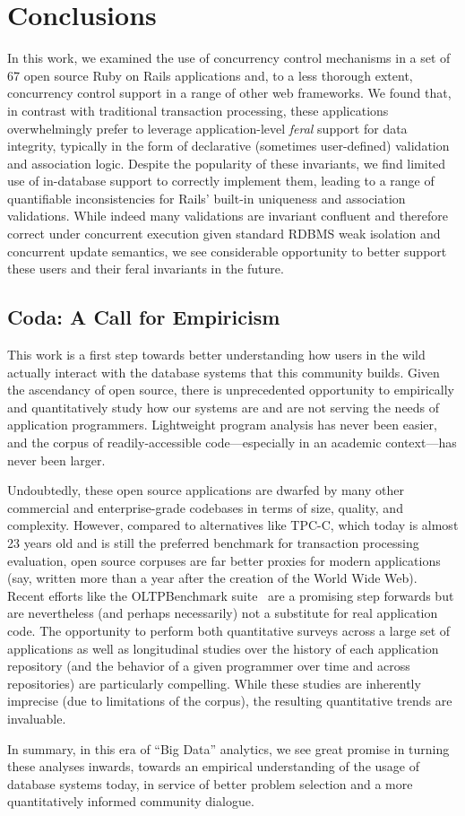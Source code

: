 
\section{Conclusions}
\label{sec:conclusion}

In this work, we examined the use of concurrency control mechanisms in
a set of 67 open source Ruby on Rails applications and, to a less
thorough extent, concurrency control support in a range of other web
frameworks. We found that, in contrast with traditional transaction
processing, these applications overwhelmingly prefer to leverage
application-level \textit{feral} support for data integrity, typically
in the form of declarative (sometimes user-defined) validation and
association logic. Despite the popularity of these invariants, we find
limited use of in-database support to correctly implement them,
leading to a range of quantifiable inconsistencies for Rails' built-in
uniqueness and association validations. While indeed many validations
are invariant confluent and therefore correct under concurrent
execution given standard RDBMS weak isolation and concurrent update
semantics, we see considerable opportunity to better support these
users and their feral invariants in the future.


\subsection*{Coda: A Call for Empiricism}

This work is a first step towards better understanding how users in
the wild actually interact with the database systems that this
community builds. Given the ascendancy of open source, there is
unprecedented opportunity to empirically and quantitatively study how
our systems are and are not serving the needs of application
programmers. Lightweight program analysis has never been easier, and
the corpus of readily-accessible code---especially in an academic
context---has never been larger.

Undoubtedly, these open source applications are dwarfed by many other
commercial and enterprise-grade codebases in terms of size, quality,
and complexity. However, compared to alternatives like TPC-C, which
today is almost 23 years old and is still the preferred benchmark for
transaction processing evaluation, open source corpuses are far better
proxies for modern applications (say, written more than a year after
the creation of the World Wide Web). Recent efforts like the
OLTPBenchmark suite~\cite{oltpbench} are a promising step forwards but
are nevertheless (and perhaps necessarily) not a substitute for real
application code. The opportunity to perform both quantitative surveys
across a large set of applications as well as longitudinal studies
over the history of each application repository (and the behavior of a
given programmer over time and across repositories) are particularly
compelling. While these studies are inherently imprecise (due to
limitations of the corpus), the resulting quantitative trends are
invaluable.

In summary, in this era of ``Big Data'' analytics, we see great
promise in turning these analyses inwards, towards an empirical
understanding of the usage of database systems today, in service of
better problem selection and a more quantitatively informed community
dialogue.

